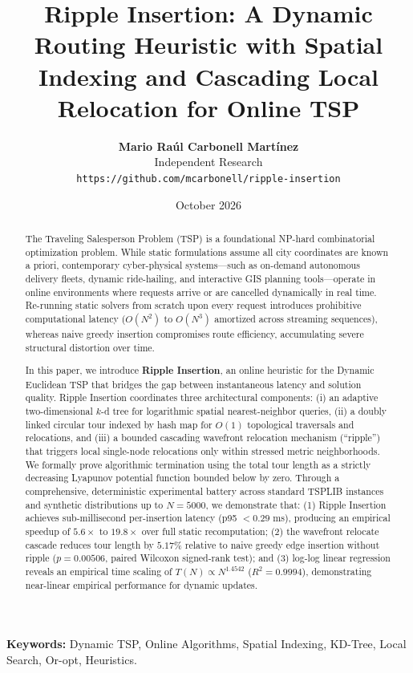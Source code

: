\documentclass[11pt,a4paper]{article}
\title{\textbf{Ripple Insertion: A Dynamic Routing Heuristic with Spatial Indexing and Cascading Local Relocation for Online TSP}}
\author{
  \textbf{Mario Raúl Carbonell Martínez} \\
  Independent Research \\
  \texttt{https://github.com/mcarbonell/ripple-insertion}
}
\date{October 2026}
\theoremstyle{definition}
\begin{document}
\maketitle

\begin{abstract}
The Traveling Salesperson Problem (TSP) is a foundational NP-hard combinatorial optimization problem. While static formulations assume all city coordinates are known a priori, contemporary cyber-physical systems---such as on-demand autonomous delivery fleets, dynamic ride-hailing, and interactive GIS planning tools---operate in online environments where requests arrive or are cancelled dynamically in real time. Re-running static solvers from scratch upon every request introduces prohibitive computational latency ($O(N^2)$ to $O(N^3)$ amortized across streaming sequences), whereas naive greedy insertion compromises route efficiency, accumulating severe structural distortion over time.

In this paper, we introduce \textbf{Ripple Insertion}, an online heuristic for the Dynamic Euclidean TSP that bridges the gap between instantaneous latency and solution quality. Ripple Insertion coordinates three architectural components: (i) an adaptive two-dimensional $k$-d tree for logarithmic spatial nearest-neighbor queries, (ii) a doubly linked circular tour indexed by hash map for $O(1)$ topological traversals and relocations, and (iii) a bounded cascading wavefront relocation mechanism (``ripple'') that triggers local single-node relocations only within stressed metric neighborhoods. We formally prove algorithmic termination using the total tour length as a strictly decreasing Lyapunov potential function bounded below by zero. Through a comprehensive, deterministic experimental battery across standard TSPLIB instances and synthetic distributions up to $N = 5000$, we demonstrate that: (1) Ripple Insertion achieves sub-millisecond per-insertion latency (p95 $< 0.29$ ms), producing an empirical speedup of $5.6\times$ to $19.8\times$ over full static recomputation; (2) the wavefront relocate cascade reduces tour length by $5.17\%$ relative to naive greedy edge insertion without ripple ($p = 0.00506$, paired Wilcoxon signed-rank test); and (3) log-log linear regression reveals an empirical time scaling of $T(N) \propto N^{1.4542}$ ($R^2 = 0.9994$), demonstrating near-linear empirical performance for dynamic updates.
\end{abstract}

\textbf{Keywords:} Dynamic TSP, Online Algorithms, Spatial Indexing, KD-Tree, Local Search, Or-opt, Heuristics.
\end{document}
